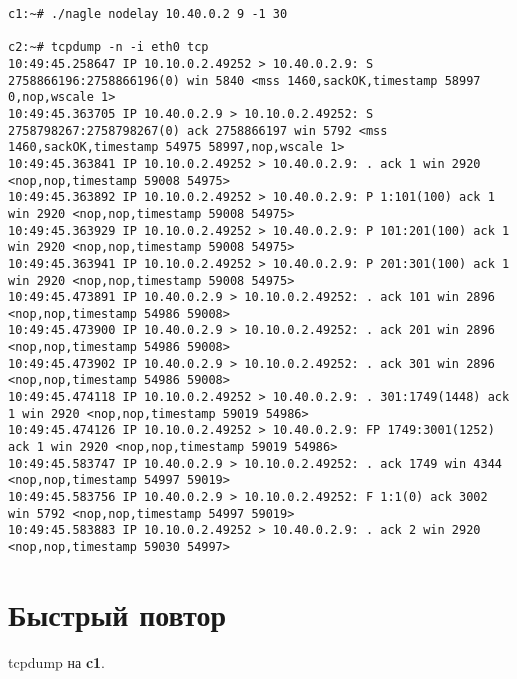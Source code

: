 \documentclass[a4paper,12pt]{article}
\begin{document}
\begin{Verbatim}
c1:~# ./nagle nodelay 10.40.0.2 9 -1 30

c2:~# tcpdump -n -i eth0 tcp
10:49:45.258647 IP 10.10.0.2.49252 > 10.40.0.2.9: S 2758866196:2758866196(0) win 5840 <mss 1460,sackOK,timestamp 58997 0,nop,wscale 1>
10:49:45.363705 IP 10.40.0.2.9 > 10.10.0.2.49252: S 2758798267:2758798267(0) ack 2758866197 win 5792 <mss 1460,sackOK,timestamp 54975 58997,nop,wscale 1>
10:49:45.363841 IP 10.10.0.2.49252 > 10.40.0.2.9: . ack 1 win 2920 <nop,nop,timestamp 59008 54975>
10:49:45.363892 IP 10.10.0.2.49252 > 10.40.0.2.9: P 1:101(100) ack 1 win 2920 <nop,nop,timestamp 59008 54975>
10:49:45.363929 IP 10.10.0.2.49252 > 10.40.0.2.9: P 101:201(100) ack 1 win 2920 <nop,nop,timestamp 59008 54975>
10:49:45.363941 IP 10.10.0.2.49252 > 10.40.0.2.9: P 201:301(100) ack 1 win 2920 <nop,nop,timestamp 59008 54975>
10:49:45.473891 IP 10.40.0.2.9 > 10.10.0.2.49252: . ack 101 win 2896 <nop,nop,timestamp 54986 59008>
10:49:45.473900 IP 10.40.0.2.9 > 10.10.0.2.49252: . ack 201 win 2896 <nop,nop,timestamp 54986 59008>
10:49:45.473902 IP 10.40.0.2.9 > 10.10.0.2.49252: . ack 301 win 2896 <nop,nop,timestamp 54986 59008>
10:49:45.474118 IP 10.10.0.2.49252 > 10.40.0.2.9: . 301:1749(1448) ack 1 win 2920 <nop,nop,timestamp 59019 54986>
10:49:45.474126 IP 10.10.0.2.49252 > 10.40.0.2.9: FP 1749:3001(1252) ack 1 win 2920 <nop,nop,timestamp 59019 54986>
10:49:45.583747 IP 10.40.0.2.9 > 10.10.0.2.49252: . ack 1749 win 4344 <nop,nop,timestamp 54997 59019>
10:49:45.583756 IP 10.40.0.2.9 > 10.10.0.2.49252: F 1:1(0) ack 3002 win 5792 <nop,nop,timestamp 54997 59019>
10:49:45.583883 IP 10.10.0.2.49252 > 10.40.0.2.9: . ack 2 win 2920 <nop,nop,timestamp 59030 54997>
\end{Verbatim}

\section{Быстрый повтор}

tcpdump на \textbf{c1}.
\end{document}
